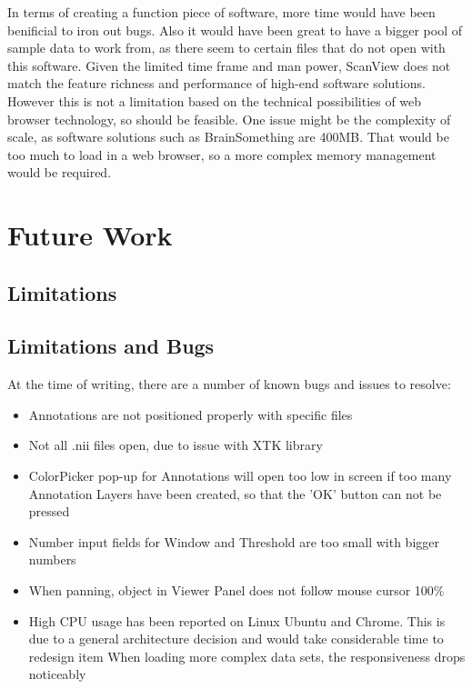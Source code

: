\documentclass[a4paper,11pt,titlepage]{article}
\begin{document}
In terms of creating a function piece of software, more time would have been benificial to iron out bugs. Also it would have been great to have a bigger pool of sample data to work from, as there seem to certain files that do not open with this software. Given the limited time frame and man power, ScanView does not match the feature richness and performance of high-end software solutions. However this is not a limitation based on the technical possibilities of web browser technology, so should be feasible. One issue might be the complexity of scale, as software solutions such as BrainSomething are 400MB. That would be too much to load in a web browser, so a more complex memory management would be required.




\section{Future Work}


\subsection{Limitations}


\subsection{Limitations and Bugs}

At the time of writing, there are a number of known bugs and issues to resolve:

\begin{itemize}

\item Annotations are not positioned properly with specific files
\item Not all .nii files open, due to issue with XTK library
\item ColorPicker pop-up for Annotations will open too low in screen if too many Annotation Layers have been created, so that the 'OK' button can not be pressed
\item Number input fields for Window and Threshold are too small with bigger numbers
\item When panning, object in Viewer Panel does not follow mouse cursor 100\%
\item High CPU usage has been reported on Linux Ubuntu and Chrome. This is due to a general architecture decision and would take considerable time to redesign
item When loading more complex data sets, the responsiveness drops noticeably

\end{itemize}
\end{document}
